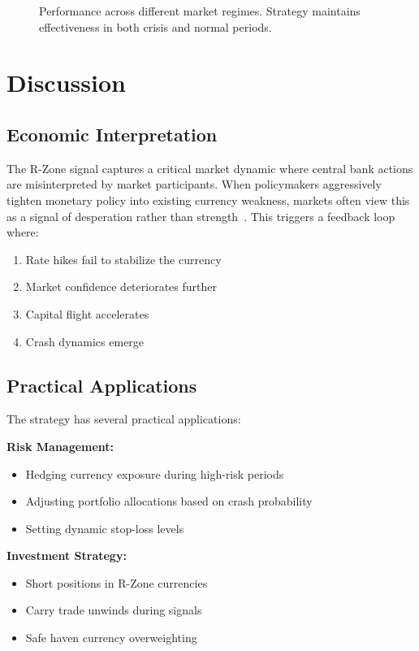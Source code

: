 \documentclass[twocolumn,ieee]{arithmaxresearch}
\begin{document}
\begin{figure}[h]
\centering
\caption{Performance across different market regimes. Strategy maintains effectiveness in both crisis and normal periods.}
\label{fig:regime_analysis}
\end{figure}

\section{Discussion}

\subsection{Economic Interpretation}

The R-Zone signal captures a critical market dynamic where central bank actions are misinterpreted by market participants. When policymakers aggressively tighten monetary policy into existing currency weakness, markets often view this as a signal of desperation rather than strength~\cite{bernanke2005monetary}. This triggers a feedback loop where:
\begin{enumerate}
    \item Rate hikes fail to stabilize the currency
    \item Market confidence deteriorates further
    \item Capital flight accelerates
    \item Crash dynamics emerge~\cite{calvo2001capital}
\end{enumerate}

\subsection{Practical Applications}

The strategy has several practical applications:

\textbf{Risk Management:}
\begin{itemize}
    \item Hedging currency exposure during high-risk periods
    \item Adjusting portfolio allocations based on crash probability
    \item Setting dynamic stop-loss levels
\end{itemize}

\textbf{Investment Strategy:}
\begin{itemize}
    \item Short positions in R-Zone currencies
    \item Carry trade unwinds during signals
    \item Safe haven currency overweighting
\end{itemize}
\end{document}
